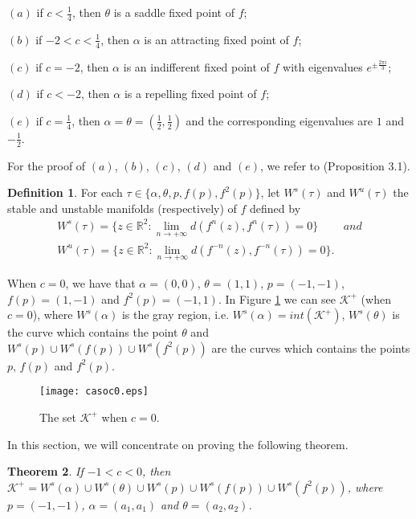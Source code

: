 \documentclass[11pt]{amsart}
\newtheorem{theorem}{Theorem}[section]
\theoremstyle{definition}
\newtheorem{definition}[theorem]{Definition}
\begin{document}
	\noindent $(a)$ if $c<\frac{1}{4}$, then $\theta$ is a saddle fixed point of $f$;
	
	\noindent $(b)$ if $-2<c<\frac{1}{4}$, then $\alpha$ is an attracting fixed point  of $f$;
	
	\noindent $(c)$ if $c=-2$, then $\alpha$ is an indifferent fixed point of $f$ with eigenvalues $e^{\pm \frac{2\pi i}{3}}$;
	
	\noindent $(d)$ if $c<-2$, then $\alpha$ is a repelling fixed point of $f$;
	
	\noindent $(e)$ if $c=\frac{1}{4}$, then $\alpha=\theta=\left(\frac{1}{2},\frac{1}{2}\right)$ and the corresponding eigenvalues are $1$ and $-\frac{1}{2}$.

For the proof of $(a)$, $(b)$, $(c)$, $(d)$ and $(e)$, we refer to \cite{bcm} (Proposition 3.1).

\begin{definition}
For each $\tau\in\{\alpha,\theta,p,f(p),f^2(p)\}$, let $W^s(\tau)$ and $W^u(\tau)$ the stable and unstable manifolds (respectively) of $f$ defined by
$$
\begin{array}{lr}
W^s(\tau)=\{z\in\mathbb{R}^2:\lim_{n\to +\infty} d(f^n(z),f^n(\tau))=0\} & and  \\
W^u(\tau)= \{z\in\mathbb{R}^2:\lim_{n\to +\infty} d(f^{-n}(z),f^{-n}(\tau))=0\}. &
\end{array}
$$
\end{definition}

When $c=0$, we have that $\alpha=(0,0)$, $\theta=(1,1)$, $p=(-1,-1)$, $f(p)=(1,-1)$ and $f^2(p)=(-1,1)$. In Figure \ref{casoc0} we can see $\mathcal{K}^+$ (when $c=0$), where $W^s(\alpha)$ is the gray region, i.e. $W^s(\alpha)=int(\mathcal{K}^+)$, $W^s(\theta)$ is the curve which contains the point $\theta$ and $W^s(p)\cup W^s(f(p))\cup W^s(f^2(p))$  are the curves which contains the points $p$, $f(p)$ and $f^2(p)$.

\begin{figure}[!h]
	\centering
	\texttt{[image: casoc0.eps]}
	\caption{The set $\mathcal{K}^+$ when $c=0$.} \label{casoc0}
\end{figure}



In this section, we will concentrate on proving the following theorem.

\begin{theorem}
	If $-1< c<0$, then $\mathcal{K}^+=W^s(\alpha)\cup W^s(\theta)\cup
	W^s(p)\cup W^s(f(p))\cup W^s(f^2(p))$, where $p=(-1,-1)$,
	$\alpha=(a_1,a_1)$ and $\theta=(a_2,a_2)$. \label{teo34}
\end{theorem}
\end{document}
